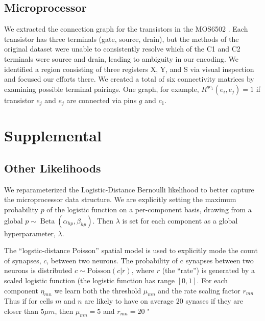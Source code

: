 \documentclass{article}
\begin{document}
\subsection{Microprocessor}
We extracted the connection graph for the transistors in the MOS6502
\autocite{visual6502source}. Each transistor has three terminals (gate,
source, drain), but the methods of the original dataset were unable to
consistently resolve which of the C1 and C2 terminals were source and
drain, leading to ambiguity in our encoding. We identified a region
consisting of three registers X, Y, and S via visual
inspection and focused our efforts there. We created a total of six
connectivity matrices by examining possible terminal pairings. One
graph, for example, $R^{gc_1}(e_i, e_j)=1$ if transistor $e_j$ and
$e_j$ are connected via pins $g$ and $c_1$. 


\newpage
\section{Supplemental}

\subsection{Other Likelihoods}
\label{supp:otherlikelihoods}

We reparameterized the Logistic-Distance Bernoulli likelihood to
better capture the microprocessor data structure. We are explicitly
setting the maximum probability $p$ of the logistic function on a
per-component basis, drawing from a global $p \sim \operatorname{Beta}(\alpha_{hp},
\beta_{hp})$. Then $\lambda$ is set for each component as a global
hyperparameter, $\lambda$.

The ``logstic-distance Poisson'' spatial model is used to explicitly mode the count of synapses, $c$, between two neurons. The probability of c synapses between two neurons is distributed $c \sim \textrm{Poisson}(c | r)$, where $r$ (the ``rate'') is generated by a scaled logistic function (the logistic function has range $[0, 1]$. For each component $\eta_{mn}$ we learn both the threshold $\mu_{mn}$ and the rate scaling factor $r_{mn}$ Thus if for cells $m$ and $n$ are likely to have on average $20$ synases if they are closer than $5 \mu m$, then $\mu_{mn} = 5$ and $r_{mn} = 20$  " 
\end{document}
